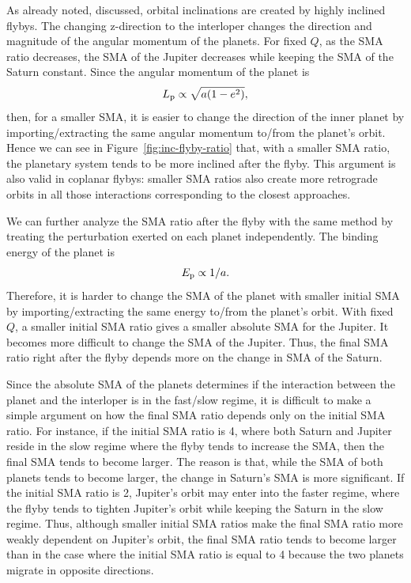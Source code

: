 \documentclass[twocolumn]{aastex63}
\newcommand*\fgr[1]{Figure~\ref{#1}}
\begin{document}
As already noted, discussed, orbital inclinations are created by highly inclined flybys. The changing z-direction to the interloper changes the direction and magnitude of the angular momentum of the planets. For fixed $Q$, as the SMA ratio decreases, the SMA of the Jupiter decreases while keeping the SMA of the Saturn constant. Since the angular momentum of the planet is 
\begin{equation}
    L_{\rm p} \propto \sqrt{a(1-e^2)},
\end{equation}
then, for a smaller SMA, it is easier to change the direction of the inner planet by importing/extracting the same angular momentum to/from the planet's orbit. Hence we can see in \fgr{fig:inc-flyby-ratio} that, with a smaller SMA ratio, the planetary system tends to be more inclined after the flyby. This argument is also valid in coplanar flybys: smaller SMA ratios also create more retrograde orbits in all those interactions corresponding to the closest approaches.

We can further analyze the SMA ratio after the flyby with the same method by treating the perturbation exerted on each planet independently. The binding energy of the planet is
\begin{equation}
    E_{\rm p}\propto 1/a.
\end{equation}
Therefore, it is harder to change the SMA of the planet with smaller initial SMA by importing/extracting the same energy to/from the planet's orbit. With fixed $Q$, a smaller initial SMA ratio gives a smaller absolute SMA for the Jupiter. It becomes more difficult to change the SMA of the Jupiter. Thus, the final SMA ratio right after the flyby depends more on the change in SMA of the Saturn. 

Since the absolute SMA of the planets determines if the interaction between the planet and the interloper is in the fast/slow regime, it is difficult to make a simple argument on how the final SMA ratio depends only on the initial SMA ratio. For instance, if the initial SMA ratio is 4, where both Saturn and Jupiter reside in the slow regime where the flyby tends to increase the SMA, then the final SMA tends to become larger. The reason is that, while the SMA of both planets tends to become larger, the change in Saturn's SMA is more significant. If the initial SMA ratio is 2, Jupiter's orbit may enter into the faster regime, where the flyby tends to tighten  Jupiter's orbit while keeping the Saturn in the slow regime. Thus, although smaller initial SMA ratios make the final SMA ratio more weakly dependent on Jupiter's orbit, the final SMA ratio tends to become larger than in the case where the initial SMA ratio is equal to 4 because the two planets migrate in opposite directions.
\end{document}
